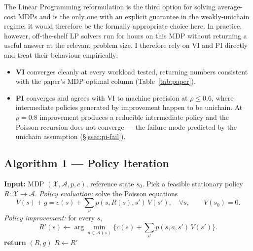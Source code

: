 \documentclass[11pt,a4paper]{article}
\newcommand{\X}{\mathcal{X}}
\newcommand{\A}{\mathcal{A}}
\begin{document}
The Linear Programming reformulation is the third option for solving
average-cost MDPs and is the only one with an explicit guarantee in
the weakly-unichain regime; it would therefore be the formally
appropriate choice here. In practice, however, off-the-shelf LP
solvers run for hours on this MDP without returning a useful answer
at the relevant problem size. I therefore rely on VI and PI directly
and treat their behaviour empirically:
\begin{itemize}[leftmargin=*]
    \item \textbf{VI} converges cleanly at every workload tested,
        returning numbers consistent with the paper's MDP-optimal
        column (Table~\ref{tab:paper}).
    \item \textbf{PI} converges and agrees with VI to machine
        precision at $\rho \le 0.6$, where intermediate policies
        generated by improvement happen to be unichain. At
        $\rho = 0.8$ improvement produces a reducible intermediate
        policy and the Poisson recursion does not converge --- the
        failure mode predicted by the unichain assumption
        (\S\ref{ssec:pi-fail}).
\end{itemize}

\subsection{Algorithm 1 --- Policy Iteration}

\begin{algorithm}[h]
\caption{Policy Iteration (average cost)}
\label{alg:pi}
\begin{algorithmic}[1]
\State \textbf{Input:} MDP $(\X, \A, p, c)$, reference state $s_0$.
\State Pick a feasible stationary policy $R: \X \to \A$.
\Repeat
  \State \emph{Policy evaluation:} solve the Poisson equations
  \begin{equation*}
    V(s) + g = c(s) + \sum_{s'} p(s, R(s), s') \, V(s'), \quad
    \forall s, \qquad V(s_0) = 0.
  \end{equation*}
  \State \emph{Policy improvement:} for every $s$,
  \begin{equation*}
    R'(s) \leftarrow \arg\min_{a \in \A(s)}
      \Big\{c(s) + \sum_{s'} p(s, a, s') \, V(s')\Big\}.
  \end{equation*}
   \textbf{return} $(R, g)$
  \Else{ } $R \leftarrow R'$
  \EndIf
{}
\end{algorithmic}
\end{algorithm}
\end{document}
